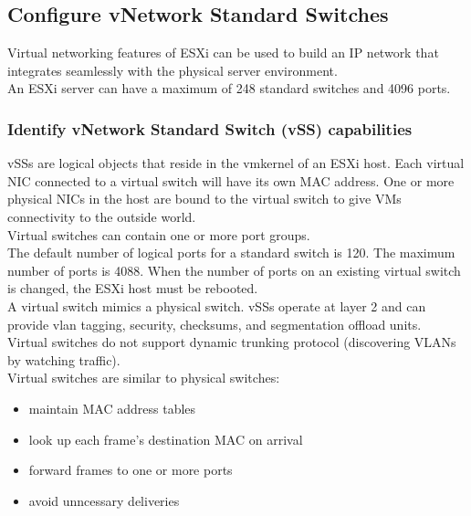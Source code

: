 \subsection{Configure vNetwork Standard Switches}

Virtual networking features of ESXi can be used to build an IP network that
integrates seamlessly with the physical server environment.\\

An ESXi server can have a maximum of 248 standard switches and 4096 ports.

\subsubsection{Identify vNetwork Standard Switch (vSS) capabilities}

vSSs are logical objects that reside in the vmkernel of an ESXi host. Each
virtual NIC connected to a virtual switch will have its own MAC address.
One or more physical NICs in the host are bound to the virtual switch to give
VMs connectivity to the outside world.\\

Virtual switches can contain one or more port groups.\\

The default number of logical ports for a standard switch is 120. The maximum
number of ports is 4088. When the number of ports on an existing virtual switch
is changed, the ESXi host must be rebooted.\\

A virtual switch mimics a physical switch. vSSs operate at layer 2 and can
provide vlan tagging, security, checksums, and segmentation offload units.\\

Virtual switches do not support dynamic trunking protocol (discovering VLANs
by watching traffic).\\

Virtual switches are similar to physical switches:

\begin{itemize}
\item maintain MAC address tables
\item look up each frame's destination MAC on arrival
\item forward frames to one or more ports
\item  avoid unncessary deliveries
\end{itemize}

